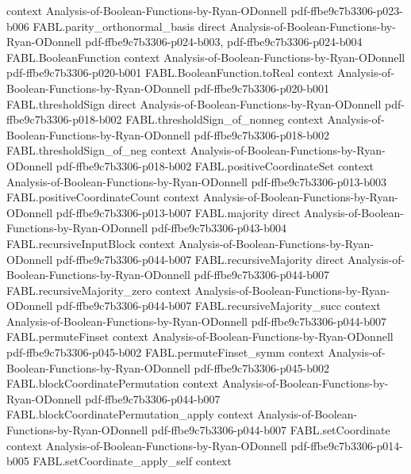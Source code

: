 \begin{theorem}
  {context}
  {Analysis-of-Boolean-Functions-by-Ryan-ODonnell}
  {pdf-ffbe9c7b3306-p023-b006}
\proofstep
  {FABL.parity_orthonormal_basis}
  {direct}
  {Analysis-of-Boolean-Functions-by-Ryan-ODonnell}
  {pdf-ffbe9c7b3306-p024-b003,
    pdf-ffbe9c7b3306-p024-b004}
\proofstep
  {FABL.BooleanFunction}
  {context}
  {Analysis-of-Boolean-Functions-by-Ryan-ODonnell}
  {pdf-ffbe9c7b3306-p020-b001}
\proofstep
  {FABL.BooleanFunction.toReal}
  {context}
  {Analysis-of-Boolean-Functions-by-Ryan-ODonnell}
  {pdf-ffbe9c7b3306-p020-b001}
\proofstep
  {FABL.thresholdSign}
  {direct}
  {Analysis-of-Boolean-Functions-by-Ryan-ODonnell}
  {pdf-ffbe9c7b3306-p018-b002}
\proofstep
  {FABL.thresholdSign_of_nonneg}
  {context}
  {Analysis-of-Boolean-Functions-by-Ryan-ODonnell}
  {pdf-ffbe9c7b3306-p018-b002}
\proofstep
  {FABL.thresholdSign_of_neg}
  {context}
  {Analysis-of-Boolean-Functions-by-Ryan-ODonnell}
  {pdf-ffbe9c7b3306-p018-b002}
\proofstep
  {FABL.positiveCoordinateSet}
  {context}
  {Analysis-of-Boolean-Functions-by-Ryan-ODonnell}
  {pdf-ffbe9c7b3306-p013-b003}
\proofstep
  {FABL.positiveCoordinateCount}
  {context}
  {Analysis-of-Boolean-Functions-by-Ryan-ODonnell}
  {pdf-ffbe9c7b3306-p013-b007}
\proofstep
  {FABL.majority}
  {direct}
  {Analysis-of-Boolean-Functions-by-Ryan-ODonnell}
  {pdf-ffbe9c7b3306-p043-b004}
\proofstep
  {FABL.recursiveInputBlock}
  {context}
  {Analysis-of-Boolean-Functions-by-Ryan-ODonnell}
  {pdf-ffbe9c7b3306-p044-b007}
\proofstep
  {FABL.recursiveMajority}
  {direct}
  {Analysis-of-Boolean-Functions-by-Ryan-ODonnell}
  {pdf-ffbe9c7b3306-p044-b007}
\proofstep
  {FABL.recursiveMajority_zero}
  {context}
  {Analysis-of-Boolean-Functions-by-Ryan-ODonnell}
  {pdf-ffbe9c7b3306-p044-b007}
\proofstep
  {FABL.recursiveMajority_succ}
  {context}
  {Analysis-of-Boolean-Functions-by-Ryan-ODonnell}
  {pdf-ffbe9c7b3306-p044-b007}
\proofstep
  {FABL.permuteFinset}
  {context}
  {Analysis-of-Boolean-Functions-by-Ryan-ODonnell}
  {pdf-ffbe9c7b3306-p045-b002}
\proofstep
  {FABL.permuteFinset_symm}
  {context}
  {Analysis-of-Boolean-Functions-by-Ryan-ODonnell}
  {pdf-ffbe9c7b3306-p045-b002}
\proofstep
  {FABL.blockCoordinatePermutation}
  {context}
  {Analysis-of-Boolean-Functions-by-Ryan-ODonnell}
  {pdf-ffbe9c7b3306-p044-b007}
\proofstep
  {FABL.blockCoordinatePermutation_apply}
  {context}
  {Analysis-of-Boolean-Functions-by-Ryan-ODonnell}
  {pdf-ffbe9c7b3306-p044-b007}
\proofstep
  {FABL.setCoordinate}
  {context}
  {Analysis-of-Boolean-Functions-by-Ryan-ODonnell}
  {pdf-ffbe9c7b3306-p014-b005}
\proofstep
  {FABL.setCoordinate_apply_self}
  {context}

\end{theorem}
